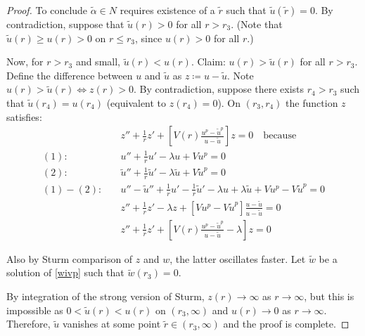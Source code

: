 \begin{lemma}
\begin{proof}
    To conclude $\tilde\alpha\in N$ requires existence of a $\tilde r$ such that $\tilde u(\tilde r)=0$.
    By contradiction, suppose that $\tilde u(r)>0$ for all $r>r_3$.
    (Note that $\tilde u(r)\geq u(r)>0$ on $r\leq r_3$, since $u(r)>0$ for all $r$.)

    Now, for $r>r_3$ and small, $\tilde u(r)<u(r)$.
    Claim: $u(r)>\tilde u(r)$ for all $r>r_3$.
    Define the difference between $u$ and $\tilde u$ as $z\coloneqq u-\tilde u$.
    Note $u(r)>\tilde u(r)\iff z(r)>0$.
    By contradiction, suppose there exists $r_4>r_3$ such that $\tilde u(r_4)=u(r_4)$ (equivalent to $z(r_4)=0$).
    On $(r_3,r_4)$ the function $z$ satisfies:
    \begin{align*}
    	&z''+\frac{1}{r}z'+\left[V(r)\frac{u^p-\tilde u^p}{u-\tilde u}\right]z = 0\quad\mathrm{because} \\
    	(1):\quad &u'' + \frac{1}{r}u' -\lambda u + Vu^p = 0 \\
    	(2):\quad &\tilde u'' + \frac{1}{r}\tilde u' -\lambda\tilde u + V\tilde u^p = 0\\
    	(1) - (2):\quad &u'' - \tilde u'' + \frac{1}{r}u' - \frac{1}{r}\tilde u' -\lambda u + \lambda\tilde u + Vu^p - V\tilde u^p = 0\\
    	 &z'' + \frac{1}{r}z' -\lambda z + \left[Vu^p - V\tilde u^p\right]
    	\frac{u-\tilde u}{u-\tilde u} = 0\\
    	 &z'' + \frac{1}{r}z' + \left[V(r)\frac{u^p-\tilde u^p}{u-\tilde u}-\lambda\right]z = 0
    \end{align*}

    \seperate


    Also by Sturm comparison of $z$ and $w$, the latter oscillates faster.
    Let $\tilde w$ be a solution of \eqref{wivp} such that $\tilde w(r_3)=0$.

    \seperate

    By integration of the strong version of Sturm, $z(r)\to\infty$ as $r\to\infty$,
    but this is impossible as $0<\tilde u(r)<u(r)$ on $(r_3,\infty)$ and $u(r)\to0$ as $r\to\infty$.
    Therefore, $\tilde u$ vanishes at some point $\tilde r\in(r_3,\infty)$
    and the proof is complete.


\end{proof}
\end{lemma}
